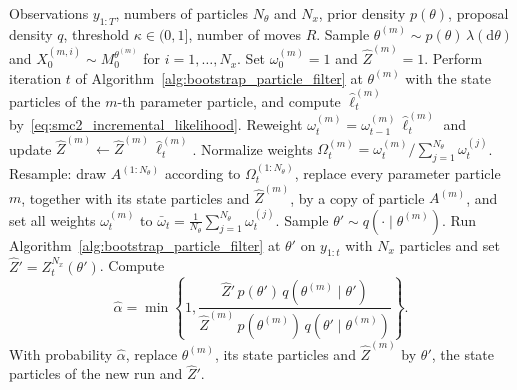 \begin{algorithm}[H]
\caption{SMC$^2$}
\label{alg:smc2}
\begin{algorithmic}[1]
    \REQUIRE Observations $y_{1:T}$, numbers of particles $N_\theta$ and $N_x$, prior density $p(\theta)$, proposal density $q$, threshold $\kappa\in(0,1]$, number of moves $R$.
        \STATE Sample $\theta^{(m)}\sim p(\theta)\,\lambda(\mathrm{d}\theta)$ and $X_0^{(m,i)}\sim M_0^{\theta^{(m)}}$ for $i=1,\ldots,N_x$.
        \STATE Set $\omega_0^{(m)} = 1$ and $\hat{Z}^{(m)} = 1$.
    \ENDFOR
            \STATE Perform iteration $t$ of Algorithm~\ref{alg:bootstrap_particle_filter} at $\theta^{(m)}$ with the state particles of the $m$-th parameter particle, and compute $\hat{\ell}_t^{(m)}$ by~\eqref{eq:smc2_incremental_likelihood}.
            \STATE Reweight $\omega_t^{(m)} = \omega_{t-1}^{(m)}\,\hat{\ell}_t^{(m)}$ and update $\hat{Z}^{(m)}\leftarrow\hat{Z}^{(m)}\,\hat{\ell}_t^{(m)}$.
        \ENDFOR
        \STATE Normalize weights $\Omega_t^{(m)} = \omega_t^{(m)}/\sum_{j=1}^{N_\theta}\omega_t^{(j)}$.
            \STATE Resample: draw $A^{(1:N_\theta)}$ according to $\Omega_t^{(1:N_\theta)}$, replace every parameter particle $m$, together with its state particles and $\hat{Z}^{(m)}$, by a copy of particle $A^{(m)}$, and set all weights $\omega_t^{(m)}$ to $\bar{\omega}_t = \frac{1}{N_\theta}\sum_{j=1}^{N_\theta}\omega_t^{(j)}$.
                    \STATE Sample $\theta'\sim q(\cdot\mid\theta^{(m)})$.
                    \STATE Run Algorithm~\ref{alg:bootstrap_particle_filter} at $\theta'$ on $y_{1:t}$ with $N_x$ particles and set $\hat{Z}' = Z_t^{N_x}(\theta')$.
                    \STATE Compute
                    \begin{equation*}
                        \hat{\alpha} = \min\left\{1,\frac{\hat{Z}'\,p(\theta')\,q(\theta^{(m)}\mid\theta')}{\hat{Z}^{(m)}\,p(\theta^{(m)})\,q(\theta'\mid\theta^{(m)})}\right\}.
                    \end{equation*}
                    \STATE With probability $\hat{\alpha}$, replace $\theta^{(m)}$, its state particles and $\hat{Z}^{(m)}$ by $\theta'$, the state particles of the new run and $\hat{Z}'$.
                \ENDFOR
            \ENDFOR
        \ENDIF
    \ENDFOR
\end{algorithmic}
\end{algorithm}


